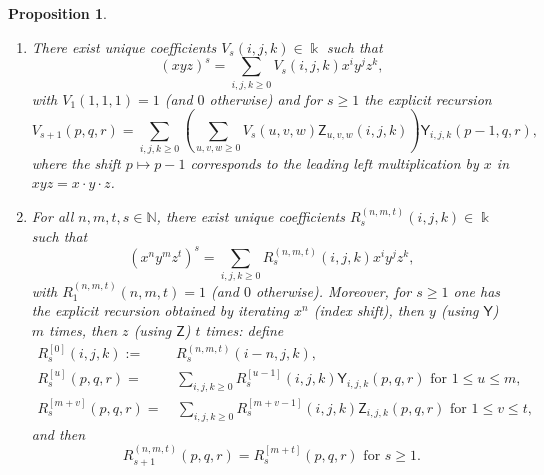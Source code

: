 \documentclass{amsart}
\newtheorem{proposition}[theorem]{Proposition}
\theoremstyle{definition}
\theoremstyle{remark}
\numberwithin{equation}{section}
\begin{document}
\begin{proposition}
\begin{enumerate}
\item [\rm (3)] There exist unique coefficients $V_s(i,j,k)\in\Bbbk$ such that
\begin{equation}\label{Vcase4}
(xyz)^s=\sum_{i,j,k\ge 0}V_s(i,j,k)x^i y^j z^k,
\end{equation}
with $V_1(1,1,1)=1$ (and $0$ otherwise) and for $s\ge 1$ the explicit recursion
\begin{equation}\label{Vreccase4}
V_{s+1}(p,q,r)=\sum_{i,j,k\ge 0}\left(\sum_{u,v,w\ge 0}V_s(u,v,w)\mathsf Z_{u,v,w}(i,j,k)\right)\mathsf Y_{i,j,k}(p-1,q,r),
\end{equation}
where the shift $p\mapsto p-1$ corresponds to the leading left multiplication by $x$ in $xyz=x\cdot y\cdot z$.

\item[\rm (4)] For all $n,m,t,s\in \mathbb{N}$, there exist unique coefficients $R^{(n,m,t)}_{s}(i,j,k)\in\Bbbk$ such that
\begin{equation}\label{Rcase4}
(x^n y^m z^t)^s=\sum_{i,j,k\ge 0}R^{(n,m,t)}_{s}(i,j,k)x^i y^j z^k,
\end{equation}
with $R^{(n,m,t)}_{1}(n,m,t)=1$ {\rm (}and $0$ otherwise{\rm )}. Moreover, for $s\ge 1$ one has the explicit recursion obtained by iterating $x^n$ {\rm (}index shift{\rm )}, then $y$ (using $\mathsf Y$) $m$ times, then $z$ (using $\mathsf Z$) $t$ times: define 
\begin{align*}
R^{[0]}_{s}(i,j,k) := &\, R^{(n,m,t)}_{s}(i-n,j,k), \\
R^{[u]}_{s}(p,q,r) = &\, \sum_{i,j,k\ge 0}R^{[u-1]}_{s}(i,j,k)\mathsf Y_{i,j,k}(p,q,r)\text{ for } 1\le u\le m, \\
R^{[m+v]}_{s}(p,q,r) = &\ \sum_{i,j,k\ge 0}R^{[m+v-1]}_{s}(i,j,k)\mathsf Z_{i,j,k}(p,q,r)\text{ for } 1\le v\le t,
\end{align*}
and then
\begin{equation}\label{Rreccase4}
R^{(n,m,t)}_{s+1}(p,q,r)=R^{[m+t]}_{s}(p,q,r)\text{ for } s\ge 1.
\end{equation}


\end{enumerate}
\end{proposition}
\end{document}
